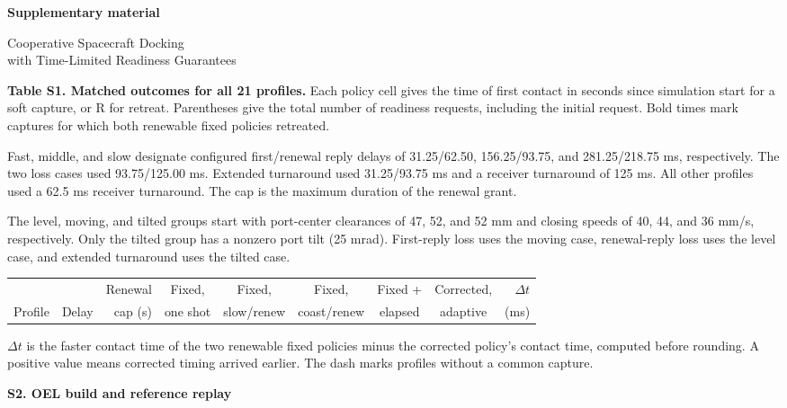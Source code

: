 \documentclass[10pt,letterpaper]{article}
\begin{document}
{\large\bfseries Supplementary material\par}
{\LARGE Cooperative Spacecraft Docking\\
with Time-Limited Readiness Guarantees\par}
\vspace{8pt}

\textbf{Table S1. Matched outcomes for all 21 profiles.}
Each policy cell gives the time of first contact in seconds since simulation start for a soft capture, or R for retreat. Parentheses give the total number of readiness requests, including the initial request. Bold times mark captures for which both renewable fixed policies retreated.

Fast, middle, and slow designate configured first/renewal reply delays of 31.25/62.50, 156.25/93.75, and 281.25/218.75 ms, respectively. The two loss cases used 93.75/125.00 ms. Extended turnaround used 31.25/93.75 ms and a receiver turnaround of 125 ms. All other profiles used a 62.5 ms receiver turnaround. The cap is the maximum duration of the renewal grant.

The level, moving, and tilted groups start with port-center clearances of 47, 52, and 52 mm and closing speeds of 40, 44, and 36 mm/s, respectively. Only the tilted group has a nonzero port tilt (25 mrad). First-reply loss uses the moving case, renewal-reply loss uses the level case, and extended turnaround uses the tilted case.

\vspace{2pt}
\begin{center}
\renewcommand{\arraystretch}{1.12}
\setlength{\tabcolsep}{3pt}
\begin{tabular}{@{}llrcccccr@{}}
\toprule
 & & Renewal & Fixed, & Fixed, & Fixed, & Fixed + & Corrected, & $\Delta t$ \\
Profile & Delay & cap (s) & one shot & slow/renew & coast/renew & elapsed & adaptive & (ms) \\
\midrule

\end{tabular}
\end{center}

\(\Delta t\) is the faster contact time of the two renewable fixed policies minus the corrected policy's contact time, computed before rounding. A positive value means corrected timing arrived earlier. The dash marks profiles without a common capture.

\newpage

{\large\bfseries S2. OEL build and reference replay\par}
\end{document}
